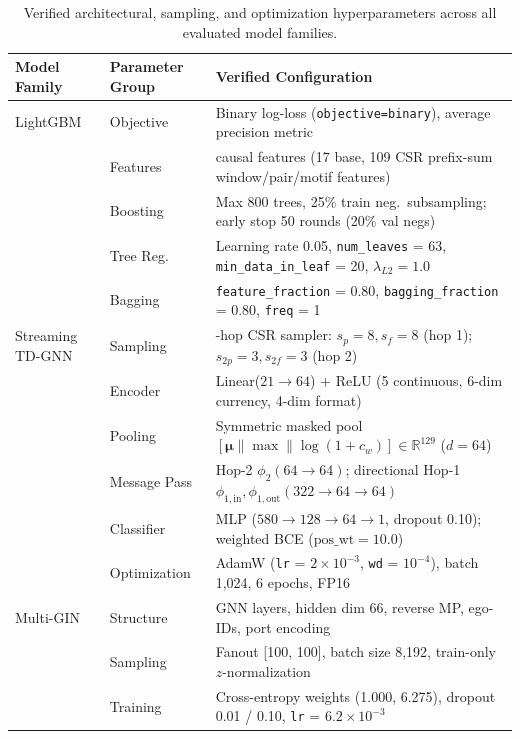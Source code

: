 \documentclass[sigconf,nonacm]{acmart}
\begin{document}
\begin{table}[ht]
\centering
\caption{Verified architectural, sampling, and optimization hyperparameters across all evaluated model families.}
\label{tab:hyperparameters}
\scriptsize
\setlength{\tabcolsep}{2.5pt}
\begin{tabular}{ll>{\raggedright\arraybackslash}p{3.8cm}}
\toprule
\textbf{Model Family} & \textbf{Parameter Group} & \textbf{Verified Configuration} \\
\midrule
LightGBM & Objective & Binary log-loss (\texttt{objective=binary}), average precision metric \\
 & Features & 126 causal features (17 base, 109 CSR prefix-sum window/pair/motif features) \\
 & Boosting & Max 800 trees, 25\% train neg.\ subsampling; early stop 50 rounds (20\% val negs) \\
 & Tree Reg. & Learning rate 0.05, \texttt{num\_leaves} = 63, \texttt{min\_data\_in\_leaf} = 20, $\lambda_{L2} = 1.0$ \\
 & Bagging & \texttt{feature\_fraction} = 0.80, \texttt{bagging\_fraction} = 0.80, \texttt{freq} = 1 \\
\midrule
Streaming TD-GNN & Sampling & 2-hop CSR sampler: $s_p=8, s_f=8$ (hop 1); $s_{2p}=3, s_{2f}=3$ (hop 2) \\
 & Encoder & Linear($21 \to 64$) + ReLU (5 continuous, 6-dim currency, 4-dim format) \\
 & Pooling & Symmetric masked pool $[\bm{\mu} \| \max \| \log(1+c_w)] \in \mathbb{R}^{129}$ ($d = 64$) \\
 & Message Pass & Hop-2 $\phi_2(64 \to 64)$; directional Hop-1 $\phi_{1,\text{in}}, \phi_{1,\text{out}}(322 \to 64 \to 64)$ \\
 & Classifier & MLP ($580 \to 128 \to 64 \to 1$, dropout 0.10); weighted BCE ($\text{pos\_wt} = 10.0$) \\
 & Optimization & AdamW (\texttt{lr} = $2 \times 10^{-3}$, \texttt{wd} = $10^{-4}$), batch 1,024, 6 epochs, FP16 \\
\midrule
Multi-GIN~\cite{egressy2024multigraph} & Structure & 2 GNN layers, hidden dim 66, reverse MP, ego-IDs, port encoding \\
 & Sampling & Fanout [100, 100], batch size 8,192, train-only $z$-normalization \\
 & Training & Cross-entropy weights (1.000, 6.275), dropout 0.01 / 0.10, \texttt{lr} = $6.2 \times 10^{-3}$ \\
\bottomrule
\end{tabular}
\end{table}
\end{document}
